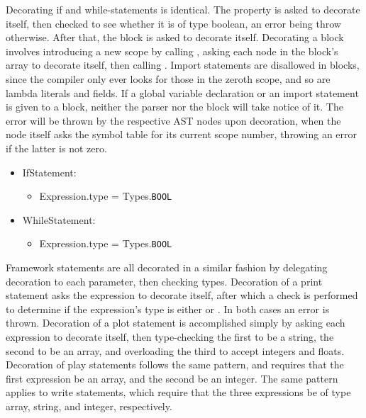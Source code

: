 Decorating if and while-statements is identical. The  property is asked to decorate itself, then checked to see whether it is of type boolean, an error being throw otherwise. After that, the block is asked to decorate itself. Decorating a block involves introducing a new scope by calling , asking each node in the block's  array to decorate itself, then calling . Import statements are disallowed in blocks, since the compiler only ever looks for those in the zeroth scope, and so are lambda literals and fields. If a global variable declaration or an import statement is given to a block, neither the parser nor the block will take notice of it. The error will be thrown by the respective AST nodes upon decoration, when the node itself asks the symbol table for its current scope number, throwing an error if the latter is not zero.

\begin{itemize}
	\item IfStatement:
		\begin{itemize}
			\item Expression.type = Types.\texttt{BOOL}
		\end{itemize}
	\item WhileStatement:
		\begin{itemize}
			\item Expression.type = Types.\texttt{BOOL}
		\end{itemize}
\end{itemize}

Framework statements are all decorated in a similar fashion by delegating decoration to each parameter, then checking types. Decoration of a print statement asks the expression to decorate itself, after which a check is performed to determine if the expression's type is either  or . In both cases an error is thrown. Decoration of a plot statement is accomplished simply by asking each expression to decorate itself, then type-checking the first to be a string, the second to be an array, and overloading the third to accept integers and floats. Decoration of play statements follows the same pattern, and requires that the first expression be an array, and the second be an integer. The same pattern applies to write statements, which require that the three expressions be of type array, string, and integer, respectively.

